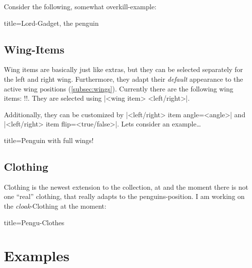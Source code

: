 \documentclass[parskip=half,english,numbers=noenddot,footnotes=nomultiple,oneside]{scrartcl}
\makeatletter
\let\say\enquote
\def\DTLlistformatitem#1{\textit{#1}}
\newcommand*\typesetselection[1][]{\begingroup\ifx!#1!\else\def\DTLlistformatitem##1{#1}\fi\dotypesetselection}
\def\dotypesetselection#1{\expandafter\DTLformatlist\expandafter{\csname @pingu@#1@\endcsname}\endgroup}
\makeatother
\begin{document}
Consider the following, somewhat overkill-example:
\begin{tcblisting}{title={Lord-Gadget, the penguin}}
\begin{tikzpicture}
	\pingu[crown 2d=pingu@bronze,
	       medal=pingu@purple, tie,
	       eye patch left=teal,
	       eye patch right=orange,
	       right wing wave, sunglasses,
	       glow thick=yellow]
\end{tikzpicture}
\end{tcblisting}

\subsection{Wing-Items}
Wing items are basically just like extras, but they can be selected separately for the left and right wing. Furthermore, they adapt their \textit{default} appearance to the active wing positions (\autoref{subsec:wings}).
Currently there are the following wing items:
\typesetselection{wingitems}.
They are selected using |<wing item> <left/right>|.

Additionally, they can be customized by |<left/right> item angle=<angle>| and |<left/right> item flip=<true/false>|.
Lets consider an example\ldots
\begin{tcblisting}{title={Penguin with full wings!}}
\begin{tikzpicture}[scale=.75]
	\pingu[lightsaber right=orange,
	  lollipop left,
	  right item angle=70,
	  right wing raise, left wing grab]
	\pingu[cane left, right item flip,
	  sign post right={Hi!}, xshift=35mm]
\end{tikzpicture}
\end{tcblisting}

\subsection{Clothing}
Clothing is the newest extension to the collection, at and the moment there is not one \say{real} clothing, that really adapts to the penguins-position.
I am working on the \textit{cloak}-Clothing at the moment:
\begin{tcblisting}{title={Pengu-Clothes}}
\begin{tikzpicture}[scale=.75]
	\pingu[cloak]
\end{tikzpicture}
\end{tcblisting}

\section{Examples}
\end{document}
